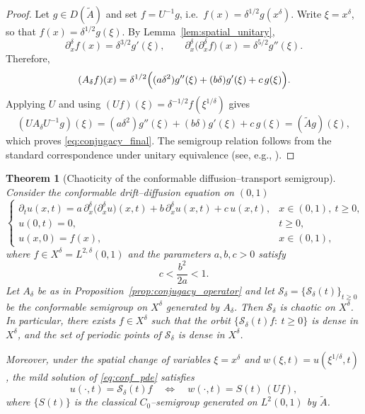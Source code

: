 \documentclass[preprint,12pt]{elsarticle}
\newtheorem{theorem}{Theorem}
\newtheorem{proof}{Proof}
\begin{document}
\begin{proof}
Let $g\in D(\widetilde A)$ and set $f=U^{-1}g$, i.e.\ $f(x)=\delta^{1/2}g(x^\delta)$.
Write $\xi=x^\delta$, so that $f(x)=\delta^{1/2}g(\xi)$.
By Lemma~\ref{lem:spatial_unitary},
\[
\partial_x^\delta f(x)=\delta^{3/2}g'(\xi),
\qquad
\partial_x^\delta\!\bigl(\partial_x^\delta f\bigr)(x)=\delta^{5/2}g''(\xi).
\]
Therefore,
\[
(A_\delta f)(x)
=
\delta^{1/2}\Bigl((a\delta^2)g''(\xi)+(b\delta)g'(\xi)+c\,g(\xi)\Bigr).
\]
Applying $U$ and using $(Uf)(\xi)=\delta^{-1/2}f(\xi^{1/\delta})$ gives
\[
(UA_\delta U^{-1}g)(\xi)
=
(a\delta^2)g''(\xi)+(b\delta)g'(\xi)+c\,g(\xi)
=
(\widetilde A g)(\xi),
\]
which proves \eqref{eq:conjugacy_final}.
The semigroup relation follows from the standard correspondence under unitary equivalence
(see, e.g., \cite{engel2000,pazy1983}).
\end{proof}

\begin{theorem}[Chaoticity of the conformable diffusion--transport semigroup]\label{thm:conformable_example412}
Consider the conformable drift--diffusion equation on $(0,1)$
\begin{equation}\label{eq:conf_pde}
\begin{cases}
\partial_t u(x,t)
=
a\,\partial_x^\delta\!\bigl(\partial_x^\delta u\bigr)(x,t)
+
b\,\partial_x^\delta u(x,t)
+
c\,u(x,t),
& x\in(0,1),\ t\ge 0,\\[1.5mm]
u(0,t)=0, & t\ge 0,\\
u(x,0)=f(x), & x\in(0,1),
\end{cases}
\end{equation}
where $f\in X^\delta=L^{2,\delta}(0,1)$ and the parameters $a,b,c>0$ satisfy
\[
c<\frac{b^2}{2a}<1.
\]
Let $A_\delta$ be as in Proposition~\ref{prop:conjugacy_operator} and let
$\mathcal S_\delta=\{\mathcal S_\delta(t)\}_{t\ge 0}$ be the conformable semigroup on $X^\delta$
generated by $A_\delta$. Then $\mathcal S_\delta$ is chaotic on $X^\delta$.
In particular, there exists $f\in X^\delta$ such that the orbit
$\{\mathcal S_\delta(t)f:\ t\ge 0\}$ is dense in $X^\delta$, and the set of periodic points of
$\mathcal S_\delta$ is dense in $X^\delta$.

Moreover, under the spatial change of variables $\xi=x^\delta$ and $w(\xi,t)=u(\xi^{1/\delta},t)$,
the mild solution of \eqref{eq:conf_pde} satisfies
\[
u(\cdot,t)=\mathcal S_\delta(t)f
\quad\Longleftrightarrow\quad
w(\cdot,t)=S(t)\,(Uf),
\]
where $\{S(t)\}$ is the classical $C_0$--semigroup generated on $L^2(0,1)$ by $\widetilde A$.
\end{theorem}
\end{document}
